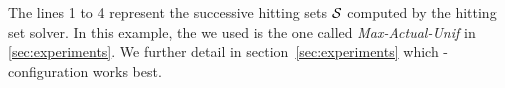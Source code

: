 The lines 1 to 4 represent the successive hitting sets $\mathcal{S}$ computed by the hitting set solver. 
In this example, the \grow we used is the one called \emph{Max-Actual-Unif} in \cref{sec:experiments}. 
We further detail in section~\ref{sec:experiments} which \grow-configuration works best. 

% 
% 





